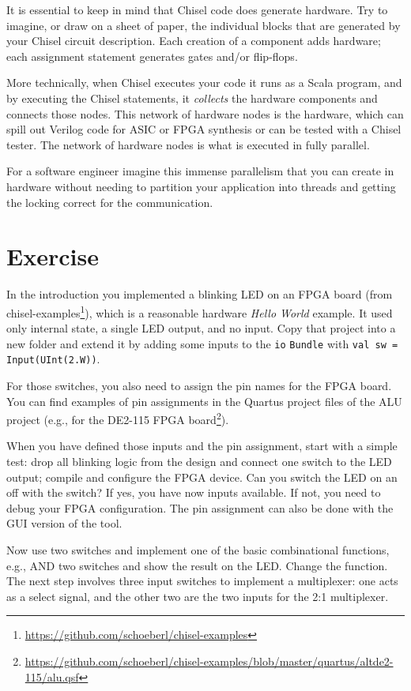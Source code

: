 \documentclass[%
    10pt,
    headinclude, footexclude,
    openright, %
    notitlepage,
    cleardoubleempty,
    headsepline,
    pointlessnumbers,
    bibtotoc, idxtotoc,
    ]{scrbook}
\newcommand{\code}[1]{{\small{\texttt{#1}}}}
\newcommand{\myref}[2]{\href{#1}{#2}}
\renewcommand{\myref}[2]{{#2}{\footnote{\url{#1}}}}
\begin{document}
It is essential to keep in mind that Chisel code does generate hardware.
Try to imagine, or draw on a sheet of paper, the individual blocks that
are generated by your Chisel circuit description.
Each creation of a component adds hardware; each assignment statement
generates gates and/or flip-flops.

More technically, when Chisel executes your code it runs as a Scala program, and
by executing the Chisel statements, it \emph{collects} the hardware components
and connects those nodes. This network of hardware nodes is the hardware,
which can spill out Verilog code for ASIC or FPGA synthesis or can be
tested with a Chisel tester.
The network of hardware nodes is what is executed in fully parallel.

For a software engineer imagine this immense parallelism that you can
create in hardware without needing to partition your application into threads
and getting the locking correct for the communication.


\section{Exercise}

In the introduction you implemented a blinking LED on an FPGA board
(from \myref{https://github.com/schoeberl/chisel-examples}{chisel-examples}), which is a reasonable
hardware \emph{Hello World} example. It used only internal state, a single LED output, and no input.
Copy that project into a new folder and extend it by adding some inputs to the \code{io} \code{Bundle}
with \code{val sw = Input(UInt(2.W))}.


\noindent For those switches, you also need to assign the pin names for the FPGA board.
You can find examples of pin assignments in the Quartus project files of the ALU project
(e.g., for the \myref{https://github.com/schoeberl/chisel-examples/blob/master/quartus/altde2-115/alu.qsf}{DE2-115
FPGA board}).

When you have defined those inputs and the pin assignment, start with a simple test:
drop all blinking logic from the design and connect one switch to the LED output;
compile and configure the FPGA device. Can you switch the LED on an off with the switch?
If yes, you have now inputs available. If not, you need to debug your FPGA configuration.
The pin assignment can also be done with the GUI version of the tool.

Now use two switches and implement one of the basic combinational functions,
e.g., AND two switches and show the result on the LED. Change the function.
The next step involves three input switches to implement a multiplexer: one acts as
a select signal, and the other two are the two inputs for the 2:1 multiplexer.
\end{document}
